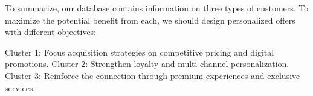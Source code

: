 To summarize, our database contains information on three types of customers. To maximize the potential benefit from each, we should design personalized offers with different objectives:

Cluster 1: Focus acquisition strategies on competitive pricing and digital promotions.
Cluster 2: Strengthen loyalty and multi-channel personalization.
Cluster 3: Reinforce the connection through premium experiences and exclusive services.
